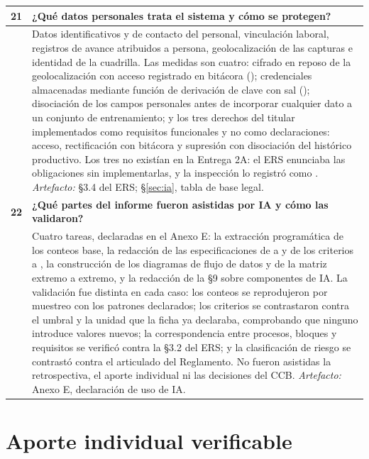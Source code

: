 \begin{longtable}{|C{0.7cm}|L{14.6cm}|}
\hline
{}\textbf{21} & \textbf{¿Qué datos personales trata el sistema y cómo se protegen?}\\ \hline
& Datos identificativos y de contacto del personal, vinculación laboral, registros de avance atribuidos a persona, geolocalización de las capturas e identidad de la cuadrilla. Las medidas son cuatro: cifrado en reposo de la geolocalización con acceso registrado en bitácora (); credenciales almacenadas mediante función de derivación de clave con sal (); disociación de los campos personales antes de incorporar cualquier dato a un conjunto de entrenamiento; y los tres derechos del titular implementados como requisitos funcionales y no como declaraciones:  acceso,  rectificación con bitácora y  supresión con disociación del histórico productivo. Los tres no existían en la Entrega 2A: el ERS enunciaba las obligaciones sin implementarlas, y la inspección lo registró como . \newline \emph{Artefacto:} \S3.4 del ERS; \S\ref{sec:ia}, tabla de base legal.\\ \hline
{}\textbf{22} & \textbf{¿Qué partes del informe fueron asistidas por IA y cómo las validaron?}\\ \hline
& Cuatro tareas, declaradas en el Anexo E: la extracción programática de los conteos base, la redacción de las especificaciones de  a  y de los criterios  a , la construcción de los diagramas de flujo de datos y de la matriz extremo a extremo, y la redacción de la \S9 sobre componentes de IA. La validación fue distinta en cada caso: los conteos se reprodujeron por muestreo con los patrones declarados; los criterios se contrastaron contra el umbral y la unidad que la ficha ya declaraba, comprobando que ninguno introduce valores nuevos; la correspondencia entre procesos, bloques y requisitos se verificó contra la \S3.2 del ERS; y la clasificación de riesgo se contrastó contra el articulado del Reglamento. No fueron asistidas la retrospectiva, el aporte individual ni las decisiones del CCB. \newline \emph{Artefacto:} Anexo E, declaración de uso de IA.\\ \hline
\end{longtable}

\section{Aporte individual verificable}

